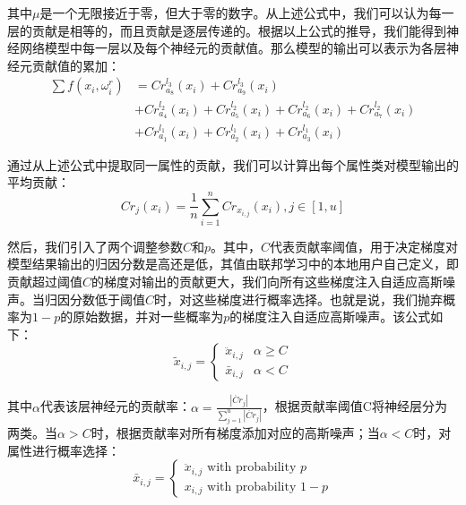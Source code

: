 其中$\mu$是一个无限接近于零，但大于零的数字。从上述公式中，我们可以认为每一层的贡献是相等的，而且贡献是逐层传递的。根据以上公式的推导，我们能得到神经网络模型中每一层以及每个神经元的贡献值。那么模型的输出可以表示为各层神经元贡献值的累加：
$$
\begin{aligned}
\sum f\left(x_{i}, \omega_{i}^{r}\right) &=Cr_{a_{8}}^{l_{3}}\left(x_{i}\right)+Cr_{a_{9}}^{l_{3}}\left(x_{i}\right)\\
&+Cr_{a_{4}}^{l_{2}}\left(x_{i}\right)+Cr_{a_{5}}^{l_{2}}\left(x_{i}\right)+Cr_{a_{6}}^{l_{2}}\left(x_{i}\right)+Cr_{a_{7}}^{l_{2}}\left(x_{i}\right)\\
&+Cr_{a_{1}}^{l_{1}}\left(x_{i}\right)+Cr_{a_{2}}^{l_{1}}\left(x_{i}\right)+Cr_{a_{3}}^{l_{1}}\left(x_{i}\right)
\end{aligned}
$$

通过从上述公式中提取同一属性的贡献，我们可以计算出每个属性类对模型输出的平均贡献：
\begin{equation}\label{eq:属性添加自适应扰动}
Cr_{j}\left(x_{i}\right)=\frac{1}{n} \sum_{i=1}^{n} Cr_{x_{i, j}}\left(x_{i}\right), j \in[1, u]
\end{equation}

然后，我们引入了两个调整参数$C$和$p$。其中，$C$代表贡献率阈值，用于决定梯度对模型结果输出的归因分数是高还是低，其值由联邦学习中的本地用户自己定义，即贡献超过阈值$C$的梯度对输出的贡献更大，我们向所有这些梯度注入自适应高斯噪声。当归因分数低于阈值$C$时，对这些梯度进行概率选择。也就是说，我们抛弃概率为$1-p$的原始数据，并对一些概率为$p$的梯度注入自适应高斯噪声。该公式如下：
\begin{equation}\label{eq:神经网络加噪}
\tilde{x}_{i, j}=\left\{\begin{array}{ll}
\ddot{x}_{i, j} & \alpha \geq C \\
\bar{x}_{i, j} & \alpha<C
\end{array}\right.
\end{equation}

其中$\alpha$代表该层神经元的贡献率：$\alpha=\frac{\left|\ddot{Cr}_{j}\right|}{\sum_{j=1}^{u}\left|\ddot{Cr}_{j}\right|}$，根据贡献率阈值C将神经层分为两类。当$\alpha>C$时，根据贡献率对所有梯度添加对应的高斯噪声；当$\alpha<C$时，对属性进行概率选择：
\begin{equation}\label{eq:神经网络加噪2}
\bar{x}_{i, j}=\left\{\begin{array}{l}
\ddot{x}_{i, j} \text { with probability } p \\
x_{i, j} \text { with probability } 1-p
\end{array}\right.
\end{equation}

